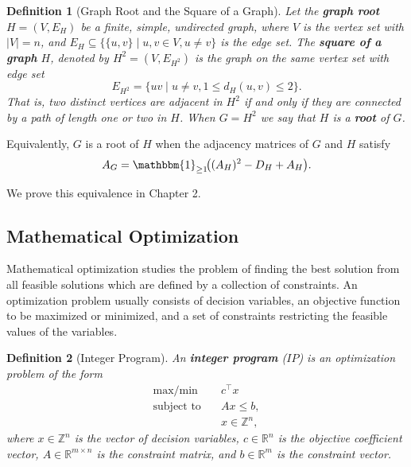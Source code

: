 \documentclass[11pt]{report}
\newtheorem{definition}{Definition}[section]
\begin{document}
\begin{definition}[Graph Root and the Square of a Graph] \label{def::square_of_a_graph}
  Let the \textbf{graph root} $H = (V, E_H)$ be a finite, simple, undirected graph, where $V$ is the vertex set with $|V| = n$, and $E_H \subseteq \{\{u,v\} \mid u,v \in V, u \neq v\}$ is the edge set.  
  The \textbf{square of a graph} $H$, denoted by $H^2 = (V, E_{H^2})$ is the graph on the same vertex set with edge set
  \begin{equation} \label{eq::fund_def_square}
    E_{H^2} = \{ uv \mid u \neq v, 1 \leq d_H(u,v) \leq 2 \}.
  \end{equation}
  That is, two distinct vertices are adjacent in $H^2$ if and only if they are connected by a path of length one or two in $H$. When $G = H^2$ we say that $H$ is a \textbf{root} of $G$. 
\end{definition}

Equivalently, $G$ is a root of $H$ when the adjacency matrices of $G$ and $H$ satisfy  
\begin{equation} \label{eq::fund_adj_eq_undirected}
  A_G = \mathbbm{1}_{\geq 1}\!\big((A_H)^2 - D_H + A_H\big).
\end{equation}

We prove this equivalence in Chapter 2.



\subsection{Mathematical Optimization} \label{subsec::mathematical_optimization}

Mathematical optimization studies the problem of finding the best solution from all feasible solutions which are defined by a collection of constraints. An optimization problem usually consists of decision variables, an objective function to be maximized or minimized, and a set of constraints restricting the feasible values of the variables.

\begin{definition}[Integer Program] \label{def::integer_program}
  An \textbf{integer program} ($IP$) is an optimization problem of the form
  \[
  \begin{aligned}
    \text{max/min}\quad & c^\top x\\
    \text{subject to}\quad & Ax\leq b,\\
    & x\in\mathbb{Z}^n,
  \end{aligned}
  \]
  where $x\in\mathbb{Z}^n$ is the vector of decision variables, $c\in\mathbb{R}^n$ is the objective coefficient vector, $A\in\mathbb{R}^{m\times n}$ is the constraint matrix, and $b\in\mathbb{R}^m$ is the constraint vector.
\end{definition}
\end{document}
